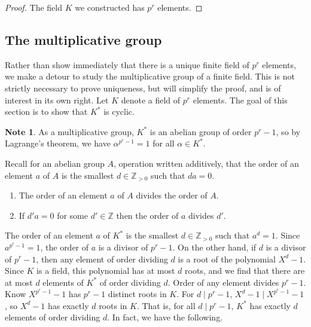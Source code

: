 \documentclass{article}
\newcommand{\Z}{\mathbb{Z}}
\theoremstyle{definition}\newtheorem{definition}{Definition}[subsection]
\theoremstyle{definition}\newtheorem{remark}[definition]{Remark}
\theoremstyle{definition}\newtheorem*{example}{Example}
\theoremstyle{definition}\newtheorem*{note}{Note}
\begin{document}
\begin{proof}
The field $ K $ we constructed has $ p^r $ elements.
\end{proof}


\subsection{The multiplicative group}

Rather than show immediately that there is a unique finite field of $ p^r $ elements, we make a detour to study the multiplicative group of a finite field. This is not strictly necessary to prove uniqueness, but will simplify the proof, and is of interest in its own right. Let $ K $ denote a field of $ p^r $ elements. The goal of this section is to show that $ K^* $ is cyclic.

\begin{note}
As a multiplicative group, $ K^* $ is an abelian group of order $ p^r - 1 $, so by Lagrange's theorem, we have $ \alpha^{p^r - 1} = 1 $ for all $ \alpha \in K^* $.
\end{note}

Recall for an abelian group $ A $, operation written additively, that the order of an element $ a $ of $ A $ is the smallest $ d \in \Z_{> 0} $ such that $ da = 0 $.
\begin{enumerate}
\item The order of an element $ a $ of $ A $ divides the order of $ A $.
\item If $ d'a = 0 $ for some $ d' \in \Z $ then the order of $ a $ divides $ d' $.
\end{enumerate}
The order of an element $ a $ of $ K^* $ is the smallest $ d \in \Z_{> 0} $ such that $ a^d = 1 $. Since $ a^{p^r - 1} = 1 $, the order of $ a $ is a divisor of $ p^r - 1 $. On the other hand, if $ d $ is a divisor of $ p^r - 1 $, then any element of order dividing $ d $ is a root of the polynomial $ X^d - 1 $. Since $ K $ is a field, this polynomial has at most $ d $ roots, and we find that there are at most $ d $ elements of $ K^* $ of order dividing $ d $. Order of any element divides $ p^r - 1 $. Know $ X^{p^r - 1} - 1 $ has $ p^r - 1 $ distinct roots in $ K $. For $ d \mid p^r - 1 $, $ X^d - 1 \mid X^{p^r - 1} - 1 $, so $ X^d - 1 $ has exactly $ d $ roots in $ K $. That is, for all $ d \mid p^r - 1 $, $ K^* $ has exactly $ d $ elements of order dividing $ d $. In fact, we have the following.
\end{document}
